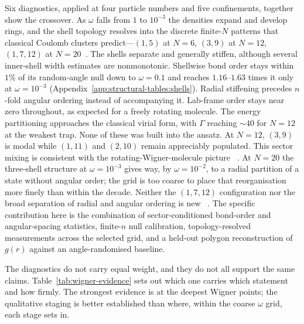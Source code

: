 Six diagnostics, applied at four particle numbers and five confinements, together show the
crossover. As $\omega$
falls from $1$ to $10^{-3}$ the densities expand and develop rings, and the shell topology
resolves into the discrete finite-$N$ patterns that classical Coulomb clusters
predict---$(1,5)$ at $N{=}6$, $(3,9)$ at $N{=}12$, $(1,7,12)$ at
$N{=}20$~\cite{schweigert1994spectralpropertieschargedparticles,Kong_2002}. The shells
separate and generally stiffen, although several inner-shell width estimates are
nonmonotonic. Shellwise bond order stays within $1\%$ of its random-angle null down to
$\omega=0.1$ and reaches $1.16$--$1.63$ times it only at $\omega=10^{-3}$
(Appendix~\ref{app:structural-tables:shells}). Radial stiffening precedes $n$-fold angular ordering instead of accompanying it. Lab-frame order stays near zero throughout, as
expected for a freely rotating molecule.
The energy partitioning approaches the classical virial form, with $\Gamma$ reaching
${\sim}40$ for $N{=}12$ at the weakest trap. None of these was built into the ansatz. At
$N{=}12$, $(3,9)$ is modal while $(1,11)$ and $(2,10)$ remain appreciably populated. This
sector mixing is consistent with the rotating-Wigner-molecule picture
~\cite{manninen2007metalclustersquantumdots,Filinov_2001}. At $N{=}20$ the
three-shell structure at $\omega=10^{-3}$ gives way, by $\omega=10^{-2}$, to a radial
partition of a state without angular order; the grid is too coarse to place that
reorganisation more finely than within the decade. Neither the $(1,7,12)$ configuration nor
the broad separation of radial and angular ordering is new
~\cite{Filinov_2001,Cavaliere2009-WignerTransport,Ghosal2007-WignerMolecules}. The specific
contribution here is the combination of sector-conditioned bond-order and angular-spacing
statistics, finite-$n$ null calibration, topology-resolved measurements across the selected
grid, and a held-out polygon reconstruction of $g(r)$ against an angle-randomised baseline.

The diagnostics do not carry equal weight, and they do not all support the same claims.
Table~\ref{tab:wigner-evidence} sets out which one carries which statement and how firmly.
The strongest evidence is at the deepest Wigner points; the qualitative staging is better
established than where, within the coarse $\omega$ grid, each stage sets in.

